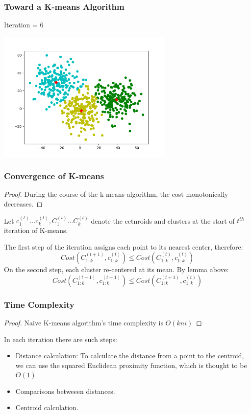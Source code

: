 \documentclass[9pt]{beamer}
\newcommand{\ccb}[1]{{\color{blue}#1}}
\begin{document}
\begin{frame}
	\frametitle{Toward a K-means Algorithm}
	Iteration = 6
	\centerline{\includegraphics[width=0.65\textwidth]{figures/iteration6.png}}

\end{frame}

\begin{frame}
	\frametitle{Convergence of K-means}
	\begin{proof}
		During the course of the k-means algorithm, the cost monotonically decreases.
	\end{proof} \pause
	Let \ccb{$c_1^{(t)} \dots c_k^{(t)}, C_1^{(t)} \dots C_k^{(t)}$} denote the cetnroids and clusters at the start of $t^{th}$ iteration of K-means.
	\pause
	\par The first step of the iteration assigns each point to its nearest center, therefore:
	$$Cost(C_{1:k}^{(t+1)}, c_{1:k}^{(t)}) \leq Cost(C_{1:k}^{(t)}, c_{1:k}^{(t)})$$
	\pause
	On the second step, each cluster re-centered at its mean. By lemma above:
	$$Cost(C_{1:k}^{(t+1)}, c_{1:k}^{(t+1)}) \leq Cost(C_{1:k}^{(t+1)}, c_{1:k}^{(t)})$$

\end{frame}
\begin{frame}
	\frametitle{Time Complexity}
	\begin{proof}
		Naive K-means algorithm's time complexity is \ccb{$O(kni)$}
	\end{proof} \pause
	In each iteration there are such steps:
	\begin{itemize}
		\item Distance calculation: To calculate the distance from a point to the centroid, we can use the squared Euclidean proximity function, which is thought to be $O(1)$
		\item Comparisons betweeen distances.
		\item Centroid calculation.
	\end{itemize}
\end{frame}
\end{document}

